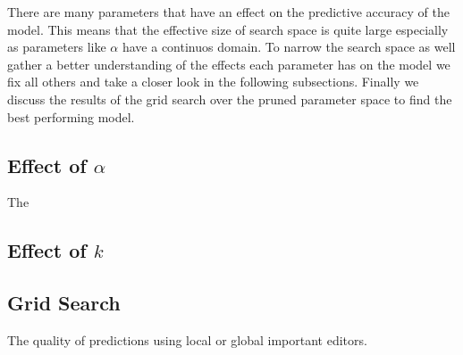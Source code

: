 There are many parameters that have an effect on the predictive accuracy of the model. This means that the effective size of search space is quite large especially as parameters like $\alpha$ have a continuos domain. To narrow the search space as well gather a better understanding of the effects each parameter has on the model we fix all others and take a closer look in the following subsections. Finally we discuss the results of the grid search over the pruned parameter space to find the best performing model.

\subsection{Effect of $\alpha$}
The 
\subsection{Effect of $k$}

\subsection{Grid Search}


The quality of predictions using local or global important editors.